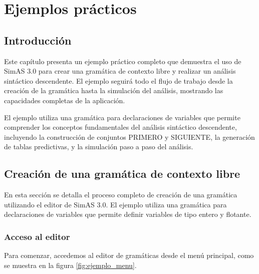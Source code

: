\chapter{Ejemplos prácticos}

\section{Introducción}

Este capítulo presenta un ejemplo práctico completo que demuestra el uso de SimAS 3.0 para crear una gramática de contexto libre y realizar un análisis sintáctico descendente. El ejemplo seguirá todo el flujo de trabajo desde la creación de la gramática hasta la simulación del análisis, mostrando las capacidades completas de la aplicación.

El ejemplo utiliza una gramática para declaraciones de variables que permite comprender los conceptos fundamentales del análisis sintáctico descendente, incluyendo la construcción de conjuntos PRIMERO y SIGUIENTE, la generación de tablas predictivas, y la simulación paso a paso del análisis.

\section{Creación de una gramática de contexto libre}

En esta sección se detalla el proceso completo de creación de una gramática utilizando el editor de SimAS 3.0. El ejemplo utiliza una gramática para declaraciones de variables que permite definir variables de tipo entero y flotante.

\subsection{Acceso al editor}

Para comenzar, accedemos al editor de gramáticas desde el menú principal, como se muestra en la figura \ref{fig:ejemplo_menu}.

